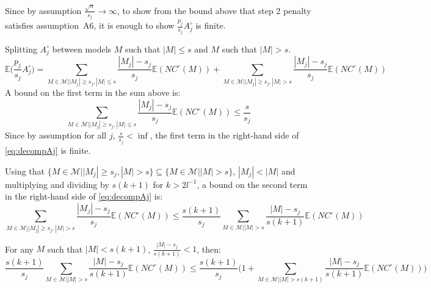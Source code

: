 \documentclass[aos]{imsart}
\theoremstyle{plain}
\newcommand{\E}{\mathbb{E}}
\begin{document}
\begin{supplement}
Since by assumption $\frac{\sqrt{n}}{s_j}\to \infty$, to show from the bound above that step 2 penalty satisfies assumption~A6, it is enough to show $\frac{p_j}{s_j}A^{\circ}_j$ is finite.

Splitting $A^{\circ}_j$ between models $M$ such that $|M|\leq s$ and $M$ such that $|M|> s$.
\begin{equation}\label{eq:decompAj}
    \E\big(\frac{p_j }{s_j} A^{\circ}_j\big) = \sum_{M \in \mathcal{M} | |M_j| \geq s_j, |M| \leq s}\frac{|M_j|-s_j}{s_j} \E(NC^{\circ}(M)) + \sum_{M \in \mathcal{M} | |M_j| \geq s_j, |M| > s}\frac{|M_j|-s_j}{s_j}\E(NC^{\circ}(M))
\end{equation}
A bound on the first term in the sum above is:
\begin{equation}\label{eq:boundfirstterm}
    \sum_{M \in \mathcal{M} | |M_j| \geq s_j, |M| \leq s}\frac{|M_j|-s_j}{s_j} \E(NC^{\circ}(M)) \leq \frac{s}{s_j}
\end{equation}
Since by assumption for all $j$, $\frac{s}{s_j}< \inf$, the first term in the right-hand side of \eqref{eq:decompAj} is finite.

Using that $\{M \in \mathcal{M} | |M_j| \geq s_j, |M| > s\} \subseteq \{M \in \mathcal{M} | |M| > s\}$, $|M_j|<|M|$ and multiplying and dividing by $s(k+1)$ for $k>2l^{-1}$, a bound on the second term in the right-hand side of \eqref{eq:decompAj} is:
\begin{equation}\label{eq:boundsecondterm}
  \sum_{M \in \mathcal{M} | |M_j| \geq s_j, |M| > s}\frac{|M_j|-s_j}{s_j}\E(NC^{\circ}(M))\leq \frac{s(k+1)}{s_j}\sum_{M \in \mathcal{M} ||M| > s}\frac{|M|-s_j}{s(k+1)}\E(NC^{\circ}(M) )  
\end{equation}

For any $M$ such that $|M|<s(k+1)$, $\frac{|M|-s_j}{s(k+1)} <1$, then:
\begin{equation}\label{eq:boundsecondterm2}
    \frac{s(k+1)}{s_j}\sum_{M \in \mathcal{M} ||M| > s}\frac{|M|-s_j}{s(k+1)}\E(NC^{\circ}(M) ) \leq \frac{s(k+1)}{s_j}\bigg(1+\sum_{M \in \mathcal{M} ||M| > s(k+1)}\frac{|M|-s_j}{s(k+1)}\E(NC^{\circ}(M) )\bigg)
\end{equation}


\end{supplement}
\end{document}
